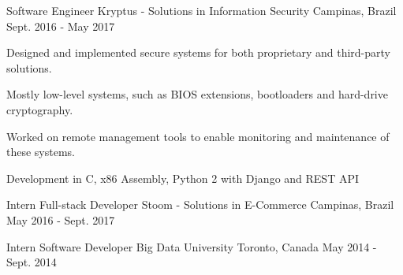 \begin{cventries}
  \cventry
    {Software Engineer} %
    {Kryptus - Solutions in Information Security} %
    {Campinas, Brazil} %
    {Sept. 2016 - May 2017} %
    {
      \begin{cvitems} %
        \item {Designed and implemented secure systems for both proprietary and third-party solutions.}
        \item {Mostly low-level systems, such as BIOS extensions, bootloaders and hard-drive cryptography.}
        \item {Worked on remote management tools to enable monitoring and maintenance of these systems.}
        \item {Development in C, x86 Assembly, Python 2 with Django and REST API}
      \end{cvitems}
    }


  \cventry
    {Intern Full-stack Developer} %
    {Stoom - Solutions in E-Commerce} %
    {Campinas, Brazil} %
    {May 2016 - Sept. 2017} %
    {
    }

  \cventry
    {Intern Software Developer} %
    {Big Data University} %
    {Toronto, Canada} %
    {May 2014 - Sept. 2014} %
    {
    }

\end{cventries}